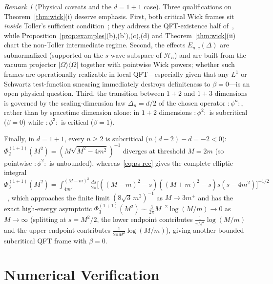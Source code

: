 \documentclass[11pt,a4paper]{article}
\theoremstyle{definition}
\theoremstyle{remark}
\newtheorem{remark}[theorem]{Remark}
\newcommand{\HH}{\mathcal{H}}
\newcommand{\ket}[1]{|#1\rangle}
\newcommand{\bra}[1]{\langle #1|}
\begin{document}
\begin{remark}[Physical caveats and the $d=1+1$ case]\label{rem:wick-caveats}
Three qualifications on Theorem~\ref{thm:wick}(i) deserve emphasis. First, both critical Wick frames sit \emph{inside} Toller's sufficient condition~\cite[Prop.~5]{Toller1999}; they address the QFT-existence half of~\cite[Rem.~2.10]{FewsterLoveridge2026}, while Proposition~\ref{prop:examples}(b),(b'),(c),(d) and Theorem~\ref{thm:wick}(ii) chart the non-Toller intermediate regime. Second, the effects $E_{n,c}(\Delta)$ are subnormalized (supported on the $s$-wave subspace of $\HH_n$) and are built from the vacuum projector $\ket{\Omega}\bra{\Omega}$ together with pointwise Wick powers; whether such frames are operationally realizable in local QFT---especially given that any $L^1$ or Schwartz test-function smearing immediately destroys definiteness to $\beta=0$---is an open physical question. Third, the transition between $1+2$ and $1+3$ dimensions is governed by the scaling-dimension law $\Delta_n=d/2$ of the chosen operator $:\!\phi^n\!:$, rather than by spacetime dimension alone: in $1+2$ dimensions $:\!\phi^2\!:$ is subcritical ($\beta=0$) while $:\!\phi^3\!:$ is critical ($\beta=1$).

Finally, in $d=1+1$, every $n\ge 2$ is subcritical ($n(d-2)-d=-2<0$): $\Phi_2^{(1+1)}(M^2)=(M\sqrt{M^2-4m^2})^{-1}$ diverges at threshold $M=2m$ (so pointwise $:\!\phi^2\!:$ is unbounded), whereas~\eqref{eq:ps-rec} gives the complete elliptic integral $\Phi_3^{(1+1)}(M^2) = \int_{4m^2}^{(M-m)^2}\frac{ds}{2\pi}\bigl[((M-m)^2-s)((M+m)^2-s)s(s-4m^2)\bigr]^{-1/2}$~\cite[Sec.~5, Eqs.~(41)--(43)]{Kaiser2025}, which approaches the finite limit $(8\sqrt{3}\,m^2)^{-1}$ as $M\to 3m^+$ and has the exact high-energy asymptotic $\Phi_3^{(1+1)}(M^2) \sim \frac{3}{2\pi}M^{-2}\log(M/m)\to 0$ as $M\to\infty$ (splitting at $s=M^2/2$, the lower endpoint contributes $\frac{1}{\pi M^2}\log(M/m)$ and the upper endpoint contributes $\frac{1}{2\pi M^2}\log(M/m)$), giving another bounded subcritical QFT frame with $\beta=0$.
\end{remark}

\section{Numerical Verification}
\label{sec:numerics}
\end{document}
